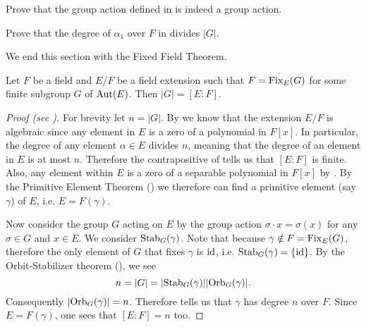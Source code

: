 \begin{exercise}
    Prove that the group action defined in  is indeed a group action.
\end{exercise}

\begin{exercise}\label{exercise-degree-of-element-under-fixed-field-action}
    Prove that the degree of $\alpha_1$ over $F$ in  divides $|G|$.
\end{exercise}

We end this section with the Fixed Field Theorem.

\begin{theorem}\label{thrm-fixed-field}
    Let $F$ be a field and $E/F$ be a field extension such that $F = \mathrm{Fix}_{E}(G)$ for some finite subgroup $G$ of $\mathrm{Aut}(E)$. Then $|G| = [E:F]$.
\end{theorem}
\begin{proof}[Proof (see {\cite[Theorem 16.5.4]{artin_2011}})]
    For brevity let $n = |G|$. By  we know that the extension $E/F$ is algebraic since any element in $E$ is a zero of a polynomial in $F[x]$. In particular, the degree of any element $\alpha \in E$ divides $n$, meaning that the degree of an element in $E$ is at most $n$. Therefore the contrapositive of  tells us that $[E:F]$ is finite. Also, any element within $E$ is a zero of a separable polynomial in $F[x]$ by . By the Primitive Element Theorem () we therefore can find a primitive element (say $\gamma$) of $E$, i.e. $E = F(\gamma)$.

    Now consider the group $G$ acting on $E$ by the group action $\sigma\cdot x = \sigma(x)$ for any $\sigma \in G$ and $x \in E$. We consider $\mathrm{Stab}_{G}(\gamma)$. Note that because $\gamma \notin F = \mathrm{Fix}_{E}(G)$, therefore the only element of $G$ that fixes $\gamma$ is $\mathrm{id}$, i.e. $\mathrm{Stab}_{G}(\gamma) = \{\mathrm{id}\}$. By the Orbit-Stabilizer theorem (), we see
    \[
        n = |G| = |\mathrm{Stab}_{G}(\gamma)||\mathrm{Orb}_{G}(\gamma)|.
    \]
    Consequently $|\mathrm{Orb}_{G}(\gamma)| = n$. Therefore  tells us that $\gamma$ has degree $n$ over $F$. Since $E = F(\gamma)$, one sees that $[E:F] = n$ too.
\end{proof}

